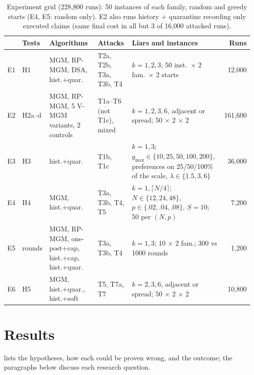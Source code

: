 \documentclass{article}
\theoremstyle{definition}
\newcommand{\1}{\mathbf{1}}
\newcommand{\gmax}{g_{\max}}
\begin{document}
\begin{table}[!t]
\caption{Experiment grid (228{,}800 runs): 50 instances of each family, random and greedy starts (E4, E5: random only). E2 also runs history + quarantine recording only executed claims (same final cost in all but 3 of 16{,}000 attacked runs).}
\label{tab:grid}
\centering\scriptsize
\setlength{\tabcolsep}{3pt}\begin{tabularx}{\linewidth}{@{}l>{\raggedright\arraybackslash}p{1.1cm}>{\raggedright\arraybackslash}p{3.5cm}>{\raggedright\arraybackslash}p{2.0cm}>{\raggedright\arraybackslash}X r@{}}
\toprule
& Tests & Algorithms & Attacks & Liars and instances & Runs \\
\midrule
E1 & H1 & MGM, RP-MGM, DSA, hist.+quar. & T2a, T2b, T3a, T3b, T4 & $k=1,2,3$; 50 inst.\ $\times$ 2 fam.\ $\times$ 2 starts & 12{,}000 \\
E2 & H2a--d & MGM, RP-MGM, 5 V-MGM variants, 2 controls & T1a--T6 (not T1c), mixed & $k=1,2,3,6$, adjacent or spread; 50 $\times$ 2 $\times$ 2 & 161{,}600 \\
E3 & H3 & hist.+quar. & T1b, T1c & $k=1,3$; $\gmax\in\{10,25,50,100,200\}$, preferences on 25/50/100\% of the scale, $\lambda\in\{1.5,3,6\}$ & 36{,}000 \\
E4 & H4 & MGM, hist.+quar. & T3a, T3b, T4, T5 & $k=1,\lceil N/4\rceil$; $N\in\{12,24,48\}$, $p\in\{.02,.04,.08\}$, $S=10$; 50 per $(N,p)$ & 7{,}200 \\
E5 & rounds & MGM, RP-MGM, one-post+cap, hist.+cap, hist.+quar. & T3a, T3b, T4 & $k=1,3$; 10 $\times$ 2 fam.; 300 vs 1000 rounds & 1{,}200 \\
E6 & H5 & MGM, hist.+quar., hist.+soft & T5, T7a, T7 & $k=2,3,6$, adjacent or spread; 50 $\times$ 2 $\times$ 2 & 10{,}800 \\
\bottomrule
\end{tabularx}
\end{table}

\section{Results}
\label{sec:res}
 lists the hypotheses, how each could be proven wrong, and the outcome; the paragraphs below discuss each research question.
\end{document}

